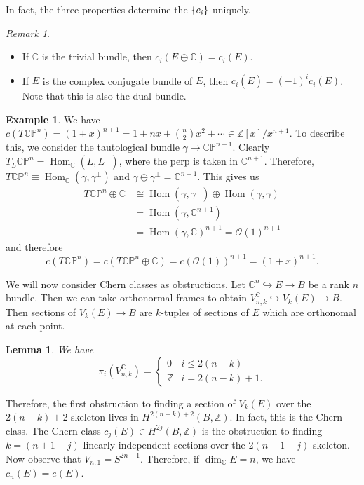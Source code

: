 \documentclass[leqno, openany]{memoir}
\newtheorem{lem}[thm]{Lemma}
\theoremstyle{definition}
\newtheorem{exm}[thm]{Example}
\theoremstyle{remark}
\newtheorem{rmk}[thm]{Remark}
\theoremstyle{plain}
\theoremstyle{definition}
\theoremstyle{remark}
\newcommand{\C}{\mathbb{C}}
\newcommand{\Z}{\mathbb{Z}}
\renewcommand{\P}{\mathbb{P}}
\newcommand{\mc}[1]{\mathcal{#1}}
\newcommand{\ol}[1]{\overline{#1}}
\DeclareMathOperator{\Hom}{Hom}
\begin{document}
In fact, the three properties determine the $\qty{c_i}$ uniquely.

\begin{rmk} \begin{itemize} \item If $\C$ is the trivial bundle, then $c_i(E
\oplus \C) = c_i(E)$.  \item If $\ol{E}$ is the complex conjugate bundle of
$E$, then $c_i(\ol{E}) = {(-1)}^i c_i(E)$. Note that this is also the dual
bundle.  \end{itemize} \end{rmk}

\begin{exm} We have $c(T \C\P^n) = {(1+x)}^{n+1} = 1 + nx + \binom{n}{2} x^2 +
    \cdots \in \Z[x]/x^{n+1}$. To describe this, we consider the tautological
    bundle $\gamma \to \C\P^{n+1}$. Clearly $T_L \C\P^n = \Hom_{\C}(L,
    L^{\perp})$, where the perp is taken in $\C^{n+1}$. Therefore, $T \C\P^n
    \equiv \Hom_{\C}(\gamma, \gamma^{\perp})$ and $\gamma \oplus \gamma^{\perp}
    = \C^{n+1}$. This gives us \begin{align*} T \C\P^n \oplus \C &\cong
        \Hom(\gamma, \gamma^{\perp}) \oplus \Hom(\gamma, \gamma) \\ &=
        \Hom(\gamma, \C^{n+1}) \\ &= {\Hom(\gamma, \C)}^{n+1} =
        {\mc{O}(1)}^{n+1} \end{align*} and therefore \[ c(T\C\P^n) = c(T\C\P^n
    \oplus \C) = {c(\mc{O}(1))}^{n+1} = {(1+x)}^{n+1}. \] \end{exm}

We will now consider Chern classes as obstructions. Let $\C^n \hookrightarrow E
\to B$ be a rank $n$ bundle. Then we can take orthonormal frames to obtain
$V_{n, k}^{\C} \hookrightarrow V_k(E) \to B$. Then sections of $V_k(E) \to B$
are $k$-tuples of sections of $E$ which are orthonomal at each point.

\begin{lem} We have \[ \pi_i(V_{n,k}^{\C}) = \begin{cases} 0 & i \leq 2 (n-k)
\\ \Z & i = 2(n-k) + 1.  \end{cases} \] \end{lem}

Therefore, the first obstruction to finding a section of $V_k(E)$ over the
$2(n-k) + 2$ skeleton lives in $H^{2(n-k)+2}(B, \Z)$. In fact, this is the
Chern class. The Chern class $c_j(E) \in H^{2j}(B, \Z)$ is the obstruction to
finding $k = (n+1-j)$ linearly independent sections over the
$2(n+1-j)$-skeleton. Now observe that $V_{n,1} = S^{2n-1}$. Therefore, if
$\dim_{\C} E = n$, we have $c_n(E) = e(E)$.
\end{document}
